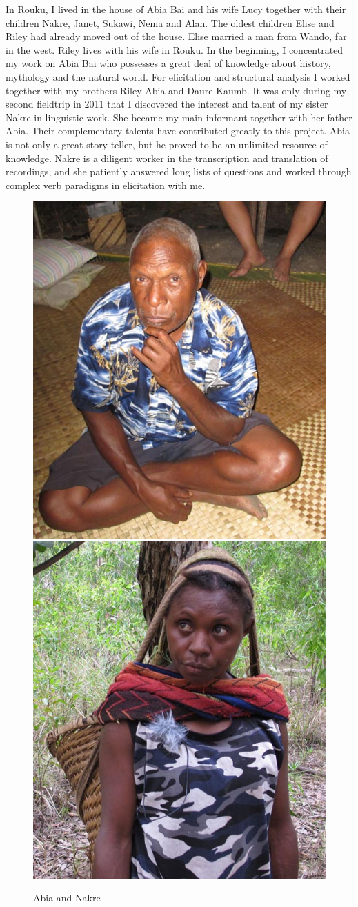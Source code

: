 In Rouku, I lived in the house of Abia Bai and his wife Lucy together with their children Nakre, Janet, Sukawi, Nema and Alan. The oldest children Elise and Riley had already moved out of the house. Elise married a man from Wando, far in the west. Riley lives with his wife in Rouku. In the beginning, I concentrated my work on Abia Bai who possesses a great deal of knowledge about history, mythology and the natural world. For elicitation and structural analysis I worked together with my brothers Riley Abia and Daure Kaumb. It was only during my second fieldtrip in 2011 that I discovered the interest and talent of my sister Nakre in linguistic work. She became my main informant together with her father Abia. Their complementary talents have contributed greatly to this project. Abia is not only a great story-teller, but he proved to be an unlimited resource of knowledge. Nakre is a diligent worker in the transcription and translation of recordings, and she patiently answered long lists of questions and worked through complex verb paradigms in elicitation with me.

\begin{figure}
  
    \includegraphics[width=.4\textwidth]{figures/foto-abia.jpg}
	\includegraphics[width=.4\textwidth]{figures/foto-nakre.jpg}
  \caption{Abia and Nakre}
  \label{fig:abia-nakre}
\end{figure}

